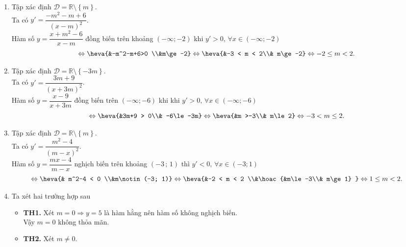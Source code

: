 \begin{bt}
{\begin{enumerate}
			 Ta có $y'=\dfrac{m-14}{(2x+m)^2}$.\\
			Hàm  số $y=\dfrac{x+7}{2x+m}$ nghịch biến trên $\left(-2;+\infty\right)$ khi $y'<0,\,\forall x\in (-2; +\infty)$
			\[\Leftrightarrow  \heva{&m-14 < 0\\&
			\dfrac{-m}{2}\le-2}\Leftrightarrow \heva{&m\ge 4\\& 
			 m < 14} \Leftrightarrow 4\le m < 14.\]
			 \item
			Tập xác định  $\mathscr{D}=\mathbb{R}\setminus \left\{m\right\}$.\\
			Ta có $y'=\dfrac{-m^2-m+6}{(x-m)^2}$.\\ 
			Hàm số $y=\dfrac{x+m^2-6}{x-m}$ đồng biến  trên khoảng $\left(-\infty;-2\right)$ khi $y'>0,\,\forall x\in (-\infty; -2)$
			\[\Leftrightarrow \heva{&-m^2-m+6>0 \\&m\ge -2}\Leftrightarrow \heva{&-3  < m < 2\\&
			m\ge-2}\Leftrightarrow -2\le m < 2.\] 
			\item 
			Tập xác định  $\mathscr{D}=\mathbb{R}\setminus \left\{-3m\right\}$.\\
			Ta có  $y'=\dfrac{3m+9}{(x+3m)^2}$.\\
			Hàm số $y=\dfrac{x-9}{x+3m}$  đồng biến trên $\left(-\infty;-6\right)$ khi khi $y'>0,\,\forall x\in (-\infty; -6)$
			\[\Leftrightarrow \heva{&3m+9 > 0\\& 
			-6\le-3m}\Leftrightarrow \heva{&m >-3\\& 
			m\le 2}\Leftrightarrow -3 <  m\le 2.\]
			 \item
			Tập  xác định $\mathscr{D}=\mathbb{R}\setminus \left\{m\right\}$.\\
			Ta  có $y'=\dfrac{m^2-4}{\left(m-x\right)^2}$.\\
			Hàm  số $y=\dfrac{mx-4}{m-x}$ nghịch biến trên khoảng $\left(-3\,;\,1\right)$ thì $y'<0,\,\forall x\in (-3; 1)$
			\[\Leftrightarrow \heva{& m^2-4 < 0 \\&m\notin (-3; 1)}\Leftrightarrow\heva{&-2 < m < 2  \\&\hoac{&m\le-3\\&
			m\ge 1} }\Leftrightarrow 1\le m <  2.\]
			\item  Ta xét hai trường hợp sau
			\begin{itemize}
				\item {\bf TH1.} Xét $m=0\Rightarrow y=5$ là  hàm hằng nên hàm số không nghịch biến.\\
				Vậy  $m=0$ không thỏa mãn.\\
				\item {\bf TH2.}  Xét $m\ne 0$.\\

\end{itemize}
\end{enumerate}}
\end{bt}
